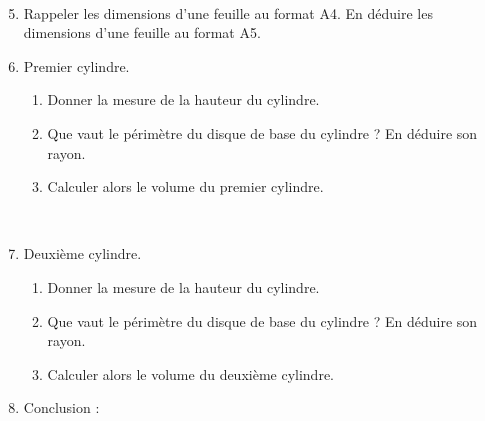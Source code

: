 \begin{enigme}
   \ \\ [-10mm]
   \begin{enumerate}
     \setcounter{enumi}{4}
        \item Rappeler les dimensions d'une feuille au format A4. En déduire les dimensions d'une feuille au format A5. \par \smallskip
           \pointilles \medskip
        \item Premier cylindre.
        \begin{enumerate}
           \item Donner la mesure de la hauteur du cylindre. \pointilles \\
           \item Que vaut le périmètre du disque de base du cylindre ? En déduire son rayon. \par \smallskip
           \pointilles \medskip
           \item Calculer alors  le volume du premier cylindre. \par \smallskip
           \pointilles \\
        \end{enumerate}
        \item Deuxième cylindre.
        \begin{enumerate}
           \item Donner la mesure de la hauteur du cylindre. \pointilles \\
           \item Que vaut le périmètre du disque de base du cylindre ? En déduire son rayon. \par \smallskip
           \pointilles \medskip
           \item Calculer alors  le volume du deuxième cylindre. \par \smallskip
           \pointilles \bigskip
        \end{enumerate}
        \item Conclusion : \pointilles \par \medskip
           \pointilles
     \end{enumerate}
\end{enigme}

